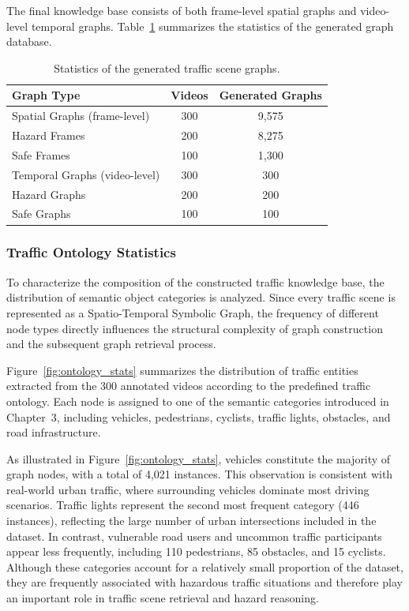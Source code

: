 \documentclass[a4paper, 11pt]{article} %
\begin{document}
The final knowledge base consists of both frame-level spatial graphs and video-level temporal graphs. Table~\ref{tab:graph_statistics} summarizes the statistics of the generated graph database.

\begin{table}[H]
\centering
\renewcommand{\arraystretch}{1.2}
\begin{tabular}{|p{6cm}|c|c|}
\hline
\textbf{Graph Type} & \textbf{Videos} & \textbf{Generated Graphs} \\
\hline
Spatial Graphs (frame-level) & 300 & 9,575 \\
\hline
\quad Hazard Frames & 200 & 8,275 \\
\hline
\quad Safe Frames & 100 & 1,300 \\
\hline
Temporal Graphs (video-level) & 300 & 300 \\
\hline
\quad Hazard Graphs & 200 & 200 \\
\hline
\quad Safe Graphs & 100 & 100 \\
\hline
\end{tabular}
\caption{Statistics of the generated traffic scene graphs.}
\label{tab:graph_statistics}
\end{table}
\subsubsection{Traffic Ontology Statistics}

To characterize the composition of the constructed traffic knowledge base, the distribution of semantic object categories is analyzed. Since every traffic scene is represented as a Spatio-Temporal Symbolic Graph, the frequency of different node types directly influences the structural complexity of graph construction and the subsequent graph retrieval process.

Figure~\ref{fig:ontology_stats} summarizes the distribution of traffic entities extracted from the 300 annotated videos according to the predefined traffic ontology. Each node is assigned to one of the semantic categories introduced in Chapter~3, including vehicles, pedestrians, cyclists, traffic lights, obstacles, and road infrastructure.

As illustrated in Figure~\ref{fig:ontology_stats}, vehicles constitute the majority of graph nodes, with a total of 4,021 instances. This observation is consistent with real-world urban traffic, where surrounding vehicles dominate most driving scenarios. Traffic lights represent the second most frequent category (446 instances), reflecting the large number of urban intersections included in the dataset. In contrast, vulnerable road users and uncommon traffic participants appear less frequently, including 110 pedestrians, 85 obstacles, and 15 cyclists. Although these categories account for a relatively small proportion of the dataset, they are frequently associated with hazardous traffic situations and therefore play an important role in traffic scene retrieval and hazard reasoning.
\end{document}
